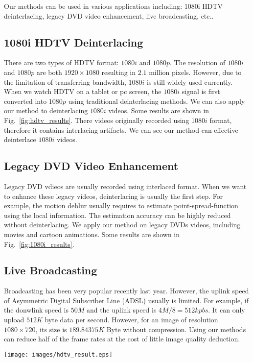 Our methods can be used in various applications including: 1080i HDTV deinterlacing, legacy DVD video enhancement, live broadcasting, etc..
\subsection{1080i HDTV Deinterlacing}
There are two types of HDTV format: $1080i$ and $1080p$.
The resolution of $1080i$ and $1080p$ are both $1920\times1080$ resulting in $2.1$ million pixels.
However, due to the limitation of transferring bandwidth, $1080i$ is still widely used currently.
When we watch HDTV on a tablet or pc screen, the $1080i$ signal is first converted into $1080p$ using traditional deinterlacing methods.
We can also apply our method to deinterlacing $1080i$ videos.
Some results are shown in Fig.~\ref{fig:hdtv_results}.
There videos originally recorded using $1080i$ format, therefore it contains interlacing artifacts.
We can see our method can effective deinterlace $1080i$ videos.
\subsection{Legacy DVD Video Enhancement}
Legacy DVD vdieos are usually recorded using interlaced format.
When we want to enhance these legacy videos, deinterlacing is usually the first step.
For example, the motion deblur usually requires to estimate point-spread-function using the local information.
The estimation accuracy can be highly reduced without deinterlacing.
We apply our method on legacy DVDs videos, including movies and cartoon animations.
Some results are shown in Fig.~\ref{fig:1080i_results}.
\subsection{Live Broadcasting}
Broadcasting has been very popular recently last year.
However, the uplink speed of Asymmetric Digital Subscriber Line (ADSL) usually is limited.
For example, if the donwlink speed is $50M$ and the uplink speed is $4M/8=512kpbs$.
It can only upload $512K$ byte data per second.
However, for an image of resolution $1080\times720$, its size is $189.84375K$ Byte without compression.
Using our methods can reduce half of the frame rates at the cost of little image quality deduction.
\begin{figure*}[!tp]
  \centering
  \texttt{[image: images/hdtv\_result.eps]}\\
  \caption{Examples of 1080i HDTV video deinterlacing. (A) The input frame. (B) The deinterlacing result of odd field. (C) The deinterlacing result of even field.}\label{fig:hdtv_results}
\end{figure*}

